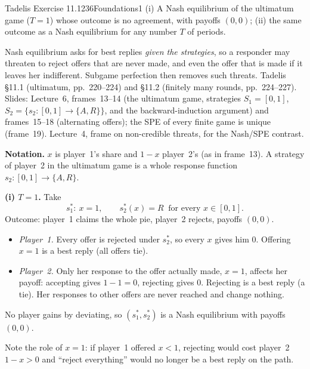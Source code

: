 \begin{exsol}{Tadelis Exercise 11.1}{236}{Foundations}{1}
\asked (i) A Nash equilibrium of the ultimatum game ($T = 1$) whose outcome is no agreement, with
payoffs $(0,0)$; (ii) the same outcome as a Nash equilibrium for any number $T$ of periods.

\method Nash equilibrium asks for best replies \emph{given the strategies}, so a responder may
threaten to reject offers that are never made, and even the offer that is made if it leaves her
indifferent. Subgame perfection then removes such threats. Tadelis \S11.1 (ultimatum, pp.~220--224)
and \S11.2 (finitely many rounds, pp.~224--227). Slides: Lecture~6, frames~13--14 (the ultimatum
game, strategies $S_1 = [0,1]$, $S_2 = \{s_2:[0,1]\to\{A,R\}\}$, and the backward-induction
argument) and frames~15--18 (alternating offers); the SPE of every finite game is unique
(frame~19). Lecture~4, frame on non-credible threats, for the Nash/SPE contrast.

\solution
\textbf{Notation.} $x$ is player~1's share and $1 - x$ player~2's (as in frame~13). A strategy of
player~2 in the ultimatum game is a whole response function $s_2 : [0,1] \to \{A, R\}$.

\textbf{(i) $T = 1$.} Take
\[
  s_1^* : \ x = 1, \qquad s_2^*(x) = R \ \text{ for every } x \in [0,1].
\]
Outcome: player~1 claims the whole pie, player~2 rejects, payoffs $(0,0)$.
\begin{itemize}
  \item \emph{Player~1.} Every offer is rejected under $s_2^*$, so every $x$ gives him $0$. Offering
  $x = 1$ is a best reply (all offers tie).
  \item \emph{Player~2.} Only her response to the offer actually made, $x = 1$, affects her payoff:
  accepting gives $1 - 1 = 0$, rejecting gives $0$. Rejecting is a best reply (a tie). Her responses
  to other offers are never reached and change nothing.
\end{itemize}
No player gains by deviating, so $(s_1^*, s_2^*)$ is a Nash equilibrium with payoffs $(0,0)$.

Note the role of $x = 1$: if player~1 offered $x < 1$, rejecting would cost player~2 $1 - x > 0$ and
``reject everything'' would no longer be a best reply on the path.


\end{exsol}

